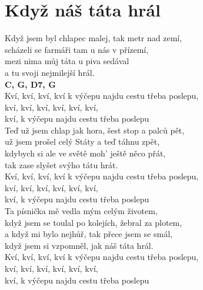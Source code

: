 \section{Když náš táta hrál}
\onehalfspacing

Když jsem byl chlapec malej, tak metr nad zemí,\\
scházeli se farmáři tam u nás v přízemí,\\
mezi nima můj táta u piva sedával\\
a tu svoji nejmilejší hrál.\\
\textbf{C, G, D7, G}\\

Kví, kví, kví, kví k výčepu najdu cestu třeba poslepu, \\
kví, kví, kví, kví, kví, kví, \\
kví, k výčepu najdu cestu třeba poslepu\\

Teď už jsem chlap jak hora, šest stop a palců pět,\\
už jsem prošel celý Státy a teď táhnu zpět,\\
kdybych si ale ve světě moh' ještě něco přát,\\
tak zase slyšet svýho tátu hrát.\\

Kví, kví, kví, kví k výčepu najdu cestu třeba poslepu, \\
kví, kví, kví, kví, kví, kví, \\
kví, k výčepu najdu cestu třeba poslepu\\

Ta písnička mě vedla mým celým životem,\\
když jsem se toulal po kolejích, žebral za plotem,\\
a když mi bylo nejhůř, tak přece jsem se smál,\\
když jsem si vzpomněl, jak náš táta hrál.\\

Kví, kví, kví, kví k výčepu najdu cestu třeba poslepu, \\
kví, kví, kví, kví, kví, kví, \\
kví, k výčepu najdu cestu třeba poslepu\\

